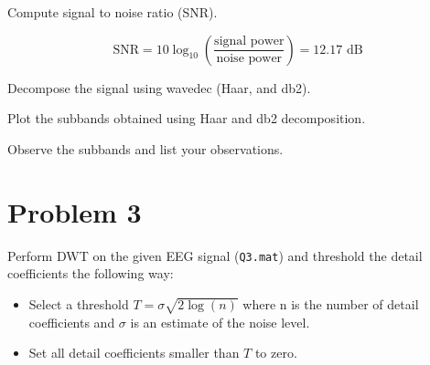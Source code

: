 \vspace{0.5cm}



\begin{tcolorbox}[colback=green!5!white,colframe=green!75!black,title=Problem 2.a]
    Compute signal to noise ratio (SNR).
\end{tcolorbox}


\begin{equation}
    \text{SNR} = 10 \log_{10} \left( \frac{\text{signal power}}{\text{noise power}} \right) = 12.17 \text{ dB}
\end{equation}



\begin{tcolorbox}[colback=green!5!white,colframe=green!75!black,title=Problem 2.b]
    Decompose the signal using wavedec (Haar, and db2).
\end{tcolorbox}




\begin{tcolorbox}[colback=green!5!white,colframe=green!75!black,title=Problem 2.c]
    Plot the subbands obtained using Haar and db2 decomposition.
\end{tcolorbox}



\begin{tcolorbox}[colback=green!5!white,colframe=green!75!black,title=Problem 2.d]
    Observe the subbands and list your observations.
\end{tcolorbox}




\section*{Problem 3} \label{sec:problem3}

\begin{tcolorbox}[colback=blue!5!white,boxrule=0pt,frame empty]
    Perform DWT on the given EEG signal (\verb|Q3.mat|) and threshold the detail coefficients
    the following way:
    \vspace{0.5em}
    \begin{itemize}
        \item Select a threshold $T = \sigma \sqrt{2 \log(n)}$ where n is the number of detail coefficients 
        and $\sigma$ is an estimate of the noise level.
        \item Set all detail coefficients smaller than $T$ to zero.
    \end{itemize}
\end{tcolorbox}


